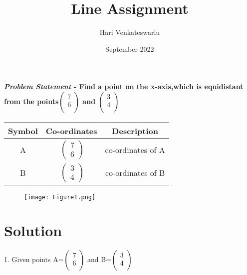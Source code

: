 \documentclass[journal,10pt,twocolumn]{article}
\title{\textbf{Line Assignment}}
\author{Hari Venkateswarlu}
\date{September 2022}
\begin{document}
\maketitle
\paragraph{\textit{Problem Statement} - Find a point on the x-axis,which is equidistant from the points$\begin{pmatrix}
  7 \\
  6 \\
 \end{pmatrix}$ and $\begin{pmatrix}
  3 \\
  4 \\
 \end{pmatrix}$}
\begin{center}
    \label{tab:truthtable}
    \setlength{\arrayrulewidth}{0.2mm}
\setlength{\tabcolsep}{5pt}
\renewcommand{\arraystretch}{1.25}
    \begin{tabular}{|c|c|c|}
    \hline %
      \large\textbf{Symbol} & \large\textbf{Co-ordinates} & \large\textbf{Description}\\
      \hline
       \large A & $\ \begin{pmatrix} 7\\ 6 \end{pmatrix}$ & co-ordinates of A \\
       \large B & $\ \begin{pmatrix} 3\\ 4 \end{pmatrix}$ & co-ordinates of B \\
	
	
      \hline
   \end{tabular}
 \end{center}\vspace{5mm}

\begin{figure}[h]
\centering
\texttt{[image: Figure1.png]}

\label{fig}
\end{figure}

\section*{Solution}
1. Given points
A=$\begin{pmatrix}
  7 \\
  6 \\
 \end{pmatrix}$
 and B=$\begin{pmatrix}
  3 \\
  4 \\
 \end{pmatrix}$
\end{document}
